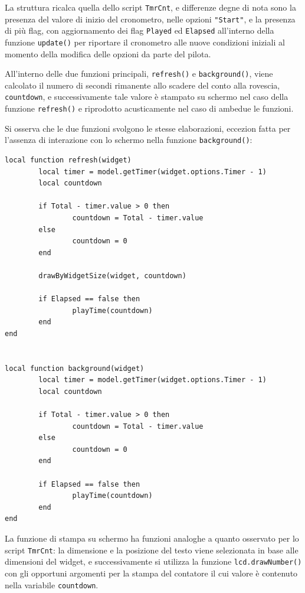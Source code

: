 \documentclass[a4paper, 12pt]{report} %
\begin{document}
La struttura ricalca quella dello script \texttt{TmrCnt}, e differenze degne di nota sono la presenza del valore di inizio del cronometro, nelle opzioni \texttt{"Start"}, e la presenza di più flag, con aggiornamento dei flag \texttt{Played} ed \texttt{Elapsed} all'interno della funzione \texttt{update()} per riportare il cronometro alle nuove condizioni iniziali al momento della modifica delle opzioni da parte del pilota.

All'interno delle due funzioni principali, \texttt{refresh()} e \texttt{background()}, viene calcolato il numero di secondi rimanente allo scadere del conto alla rovescia, \texttt{countdown}, e successivamente tale valore è stampato su schermo nel caso della funzione \texttt{refresh()} e riprodotto acusticamente nel caso di ambedue le funzioni.

Si osserva che le due funzioni svolgono le stesse elaborazioni, eccezion fatta per l'assenza di interazione con lo schermo nella funzione \texttt{background()}:

\begin{lstlisting}
local function refresh(widget)
        local timer = model.getTimer(widget.options.Timer - 1)
        local countdown

        if Total - timer.value > 0 then
                countdown = Total - timer.value
        else
                countdown = 0
        end

        drawByWidgetSize(widget, countdown)

        if Elapsed == false then
                playTime(countdown)
        end
end


local function background(widget)
        local timer = model.getTimer(widget.options.Timer - 1)
        local countdown

        if Total - timer.value > 0 then
                countdown = Total - timer.value
        else
                countdown = 0
        end

        if Elapsed == false then
                playTime(countdown)
        end
end
\end{lstlisting}

La funzione di stampa su schermo ha funzioni analoghe a quanto osservato per lo script \texttt{TmrCnt}: la dimensione e la posizione del testo viene selezionata in base alle dimensioni del widget, e successivamente si utilizza la funzione \texttt{lcd.drawNumber()} con gli opportuni argomenti per la stampa del contatore il cui valore è contenuto nella variabile \texttt{countdown}.
\end{document}
